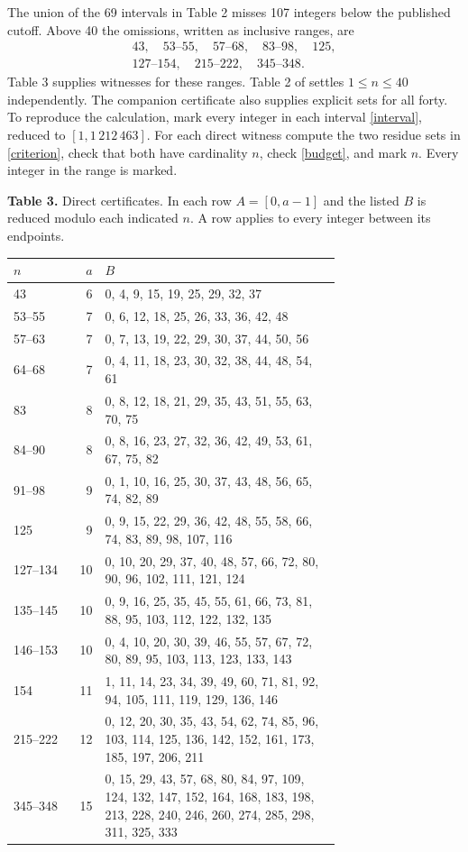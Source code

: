 \documentclass[11pt]{article}
\begin{document}
The union of the 69 intervals in Table 2 misses 107 integers below the published cutoff. Above 40 the omissions, written as inclusive ranges, are
\[
\begin{gathered}
43,\quad 53\text{--}55,\quad 57\text{--}68,\quad83\text{--}98,\quad125,\\
127\text{--}154,\quad215\text{--}222,\quad345\text{--}348 .
\end{gathered}
\]
Table 3 supplies witnesses for these ranges. Table 2 of \cite{BG} settles $1\le n\le40$ independently. The companion certificate also supplies explicit sets for all forty. To reproduce the calculation, mark every integer in each interval \eqref{interval}, reduced to $[1,1\,212\,463]$. For each direct witness compute the two residue sets in \eqref{criterion}, check that both have cardinality $n$, check \eqref{budget}, and mark $n$. Every integer in the range is marked.

\newpage
\textbf{Table 3.} Direct certificates. In each row $A=[0,a-1]$ and the listed $B$ is reduced modulo each indicated $n$. A row applies to every integer between its endpoints.\\[4pt]
{\small\begin{tabular}{l r p{0.72\linewidth}}
$n$ & $a$ & $B$\\ \hline
43 & 6 & 0, 4, 9, 15, 19, 25, 29, 32, 37 \\[3pt]
53--55 & 7 & 0, 6, 12, 18, 25, 26, 33, 36, 42, 48 \\[3pt]
57--63 & 7 & 0, 7, 13, 19, 22, 29, 30, 37, 44, 50, 56 \\[3pt]
64--68 & 7 & 0, 4, 11, 18, 23, 30, 32, 38, 44, 48, 54, 61 \\[3pt]
83 & 8 & 0, 8, 12, 18, 21, 29, 35, 43, 51, 55, 63, 70, 75 \\[3pt]
84--90 & 8 & 0, 8, 16, 23, 27, 32, 36, 42, 49, 53, 61, 67, 75, 82 \\[3pt]
91--98 & 9 & 0, 1, 10, 16, 25, 30, 37, 43, 48, 56, 65, 74, 82, 89 \\[3pt]
125 & 9 & 0, 9, 15, 22, 29, 36, 42, 48, 55, 58, 66, 74, 83, 89, 98, 107, 116 \\[3pt]
127--134 & 10 & 0, 10, 20, 29, 37, 40, 48, 57, 66, 72, 80, 90, 96, 102, 111, 121, 124 \\[3pt]
135--145 & 10 & 0, 9, 16, 25, 35, 45, 55, 61, 66, 73, 81, 88, 95, 103, 112, 122, 132, 135 \\[3pt]
146--153 & 10 & 0, 4, 10, 20, 30, 39, 46, 55, 57, 67, 72, 80, 89, 95, 103, 113, 123, 133, 143 \\[3pt]
154 & 11 & 1, 11, 14, 23, 34, 39, 49, 60, 71, 81, 92, 94, 105, 111, 119, 129, 136, 146 \\[3pt]
215--222 & 12 & 0, 12, 20, 30, 35, 43, 54, 62, 74, 85, 96, 103, 114, 125, 136, 142, 152, 161, 173, 185, 197, 206, 211 \\[3pt]
345--348 & 15 & 0, 15, 29, 43, 57, 68, 80, 84, 97, 109, 124, 132, 147, 152, 164, 168, 183, 198, 213, 228, 240, 246, 260, 274, 285, 298, 311, 325, 333 \\[3pt]
\end{tabular}}
\end{document}
